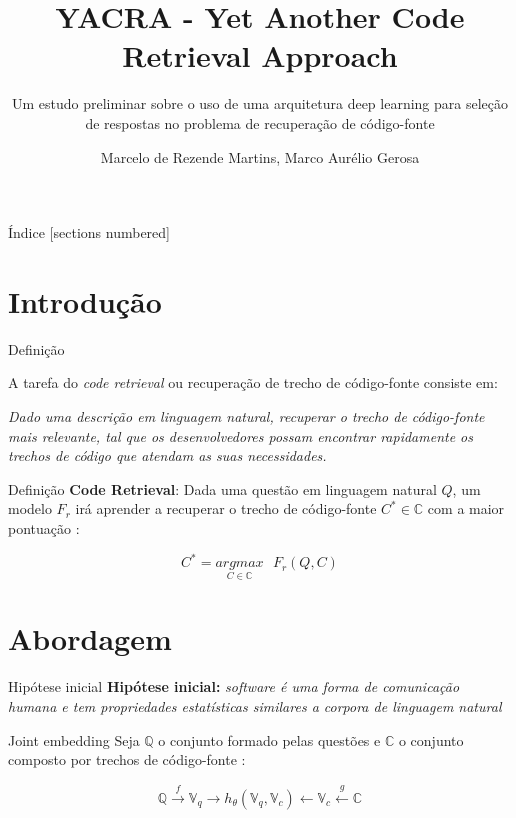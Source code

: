 \documentclass[10pt]{beamer}
\title{YACRA - Yet Another Code Retrieval Approach}
\subtitle{Um estudo preliminar sobre o uso de uma arquitetura deep learning para seleção de respostas no problema de recuperação de código-fonte}
\date{}
\author{Marcelo de Rezende Martins\inst{1}, Marco Aurélio Gerosa\inst{2}}
\institute{\inst{1}Instituto de Pesquisas Tecnológicas
  (IPT) \and \inst{2}Northern Arizona University (NAU)}
\begin{document}
\maketitle

\begin{frame}{Índice}
  [sections numbered]
  \tableofcontents%
\end{frame}

\section[Introdução]{Introdução}

\begin{frame}[fragile]{Definição}

A tarefa do \textit{code retrieval} ou recuperação de trecho de código-fonte consiste em:
 
\emph{Dado uma descrição em linguagem natural, recuperar o trecho de código-fonte mais relevante, tal que os desenvolvedores possam encontrar rapidamente os trechos de código que atendam as suas necessidades. \cite{Chen-bi-variational-autoencoder:2018}}
 
\end{frame}
\begin{frame}[fragile]{Definição}
  \textbf{Code Retrieval}: Dada uma questão em linguagem natural $Q$, um modelo $F_{r}$ irá aprender a recuperar o trecho de código-fonte $C^{*} \in \mathbb{C}$ com a maior pontuação \cite{yao-2018}:

\begin{equation}\label{eq:code-retrieval}
C^{*} = \underset{C \in \mathbb{C}}{argmax}\text{ } F_{r}(Q , C)
\end{equation}
  
\end{frame}

\section{Abordagem}

\begin{frame}{Hipótese inicial}
	\textbf{Hipótese inicial:} \emph{software é uma forma de comunicação humana e tem propriedades estatísticas similares a corpora de linguagem natural \cite{Allamanis:2018:SML}}
\end{frame}

\begin{frame}{Joint embedding}
	Seja $\mathbb{Q}$ o conjunto formado pelas questões e $\mathbb{C}$ o conjunto composto por trechos de código-fonte \cite{Gu-deep-code-search:2018}:
	
    \begin{equation}
        \mathbb{Q} \xrightarrow{f} \mathbb{V}_{q} \rightarrow h_{\theta}(\mathbb{V}_{q}, \mathbb{V}_{c}) \leftarrow \mathbb{V}_{c} \xleftarrow{g} \mathbb{C}
    \end{equation}
\end{frame}
\end{document}
